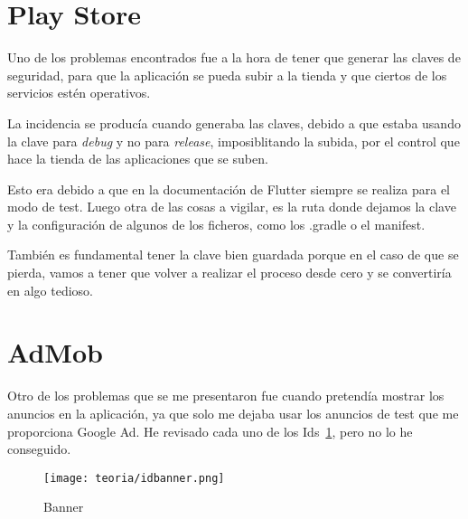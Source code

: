 %

\section{Play Store}
Uno de los problemas encontrados fue a la hora de tener que generar las claves de seguridad, para que la aplicación se pueda subir a la tienda y que ciertos de los servicios estén operativos.

La incidencia se producía cuando generaba las claves, debido a que estaba usando la clave para \emph{debug} y no para \emph{release}, imposiblitando la subida, por el control que hace la tienda de las aplicaciones que se suben.

Esto era debido a que en la documentación de Flutter siempre se realiza para el modo de test. Luego otra de las cosas a vigilar, es la ruta donde dejamos la clave y la configuración de algunos de los ficheros, como los .gradle o el manifest.

También es fundamental tener la clave bien guardada porque en el caso de que se pierda, vamos a tener que volver a realizar el proceso desde cero y se convertiría en algo tedioso.

\section{AdMob}
Otro de los problemas que se me presentaron fue cuando pretendía mostrar los anuncios en la aplicación, ya que solo me dejaba usar los anuncios de test que me proporciona Google Ad. He revisado cada uno de los Ids~\ref{fig:idbanner}, pero no lo he conseguido.

\begin{figure}[H]
	\centering
	\texttt{[image: teoria/idbanner.png]}
	\caption{Banner}\label{fig:idbanner}
\end{figure}

